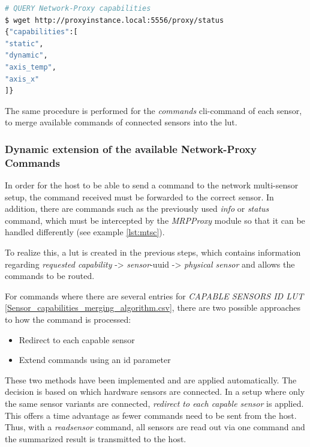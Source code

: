\begin{lstlisting}[language=bash, caption={MRPproxy REST enpoiint query examples}, label=lst:mtsc]
# QUERY Network-Proxy capabilities
$ wget http://proxyinstance.local:5556/proxy/status
{"capabilities":[
"static",
"dynamic",
"axis_temp",
"axis_x"
]}
\end{lstlisting}

The same procedure is performed for the \emph{commands}
\gls{cli}-command of each sensor, to merge available commands of
connected sensors into the \gls{lut}.

\hypertarget{dynamic-extension-of-the-available-network-proxy-commands}{%
\subsubsection{Dynamic extension of the available Network-Proxy
Commands}\label{dynamic-extension-of-the-available-network-proxy-commands}}

In order for the host to be able to send a command to the network
multi-sensor setup, the command received must be forwarded to the
correct sensor. In addition, there are commands such as the previously
used \emph{info} or \emph{status} command, which must be intercepted by
the \emph{MRPProxy} module so that it can be handled differently (see
example \ref{lst:mtsc}).

To realize this, a \gls{lut} is created in the previous steps, which
contains information regarding \emph{requested capability}
-\textgreater{} \emph{sensor}-\gls{uuid} -\textgreater{} \emph{physical
sensor} and allows the commands to be routed.

For commands where there are several entries for \emph{CAPABLE SENSORS
ID LUT} \ref{Sensor_capabilities_merging_algorithm.csv}, there are two
possible approaches to how the command is processed:

\begin{itemize}
\tightlist
\item
  Redirect to each capable sensor
\item
  Extend commands using an id parameter
\end{itemize}

These two methods have been implemented and are applied automatically.
The decision is based on which hardware sensors are connected. In a
setup where only the same sensor variants are connected, \emph{redirect
to each capable sensor} is applied. This offers a time advantage as
fewer commands need to be sent from the host. Thus, with a
\emph{readsensor} command, all sensors are read out via one command and
the summarized result is transmitted to the host.

